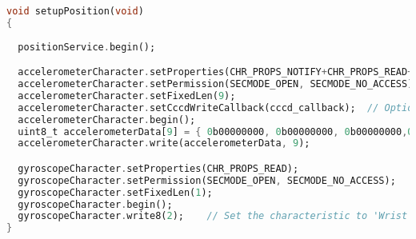 \begin{lstlisting}[float,language=dart,caption=Tập lệnh đọc dữ liệu từ BLE, label=flutter_get_data,captionpos=b]
void setupPosition(void)
{
 
  positionService.begin();

  accelerometerCharacter.setProperties(CHR_PROPS_NOTIFY+CHR_PROPS_READ+CHR_PROPS_WRITE );
  accelerometerCharacter.setPermission(SECMODE_OPEN, SECMODE_NO_ACCESS);
  accelerometerCharacter.setFixedLen(9);
  accelerometerCharacter.setCccdWriteCallback(cccd_callback);  // Optionally capture CCCD updates
  accelerometerCharacter.begin();
  uint8_t accelerometerData[9] = { 0b00000000, 0b00000000, 0b00000000,0b00000000,0b00000000,0b00000000,0b00000000,0b00000000,0b00000000}; // Set the characteristic to use 8-bit values, with the sensor connected and detected
  accelerometerCharacter.write(accelerometerData, 9);

  gyroscopeCharacter.setProperties(CHR_PROPS_READ);
  gyroscopeCharacter.setPermission(SECMODE_OPEN, SECMODE_NO_ACCESS);
  gyroscopeCharacter.setFixedLen(1);
  gyroscopeCharacter.begin();
  gyroscopeCharacter.write8(2);    // Set the characteristic to 'Wrist' (2)
}

\end{lstlisting}


